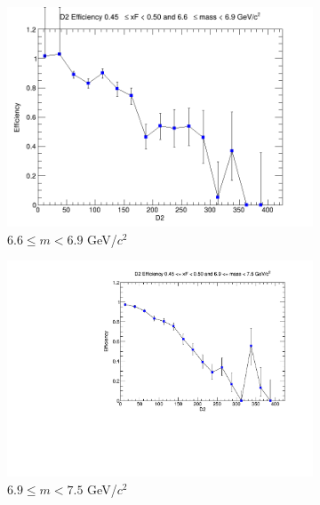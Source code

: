 \begin{figure}[p]
\begin{subfigure}[b]{0.32\textwidth}
        \includegraphics[width=\textwidth]{./kTrackerEfficiencyPlots/D2_Efficiency_xF9_mass8.png}
        \caption{$6.6 \leq m < 6.9$ GeV/$c^2$}
        \label{fig:xF9_mass8}
    \end{subfigure}
    \vspace{0.5cm}
    \begin{subfigure}[b]{0.32\textwidth}
        \centering
        \includegraphics[width=\textwidth]{./kTrackerEfficiencyPlots/D2_Efficiency_xF9_mass9.pdf}
        \caption{$6.9 \leq m < 7.5$ GeV/$c^2$}
        \label{fig:xF9_mass9}
    \end{subfigure}
    \hfill
    \begin{subfigure}[b]{0.32\textwidth}
        \centering

\end{subfigure}
\end{figure}
